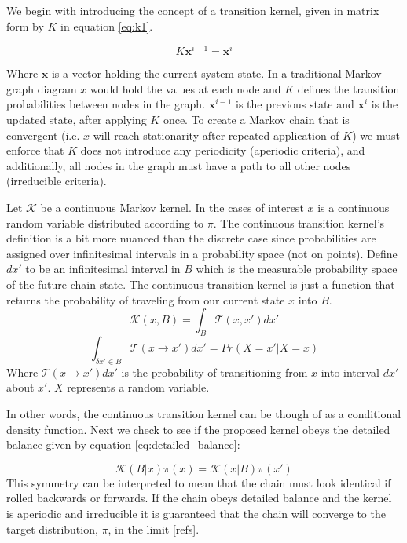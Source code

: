 \documentclass[10pt,a4paper]{report}
\begin{document}
We begin with introducing the concept of a transition kernel, given in matrix form by $K$ in equation \ref{eq:k1}. 

\begin{equation}
K \mathbf x^{i-1} = \mathbf x^{i}
\label{eq:k1}
\end{equation}

Where $\mathbf x$ is a vector holding the current system state.  In a traditional Markov graph diagram $x$ would hold the values at each node and $K$ defines the transition probabilities between nodes in the graph.  $\mathbf x^{i-1}$ is the previous state and $\mathbf x^{i}$ is the updated state, after applying $K$ once.  To create a Markov chain that is convergent (i.e. $x$ will reach stationarity after repeated application of $K$) we must enforce that $K$ does not introduce any periodicity (aperiodic criteria), and additionally, all nodes in the graph must have a path to all other nodes (irreducible criteria).

Let $\mathcal{K} $ be a continuous Markov kernel.  In the cases of interest $x$ is a continuous random variable distributed according to $\pi$.
The continuous transition kernel's definition is a bit more nuanced than the discrete case since probabilities are assigned over infinitesimal intervals in a probability space (not on points).
Define $dx'$ to be an infinitesimal interval in $B$ which is the measurable probability space of the future chain state.  The continuous transition kernel is just a function that returns the probability of traveling from our current state $x$ into $B$.
\begin{equation}
    \mathcal K(x, B) = \int_B \mathcal T(x, x')dx'
\end{equation}
\begin{equation}
    \int_{\delta x' \in B} \mathcal T(x \rightarrow x')dx'  = Pr(X = x' |X=x)
\end{equation}
Where $\mathcal T(x\rightarrow x')dx'$ is the probability of transitioning from $x$ into interval $dx'$ about $x'$.  $X$ represents a random variable.

In other words, the continuous transition kernel can be though of as a conditional density function.
Next we check to see if the proposed kernel obeys the detailed balance given by equation \ref{eq:detailed_balance}:

\begin{equation}
\mathcal K(B| x) \pi(x) = \mathcal K(x| B) \pi(x')
\label{eq:detailed_balance}
\end{equation}
This symmetry can be interpreted to mean that the chain must look identical if rolled backwards or forwards.
If the chain obeys detailed balance and the kernel is aperiodic and irreducible it is guaranteed that the chain will converge to the target distribution, $\pi$, in the limit [refs].
\end{document}

